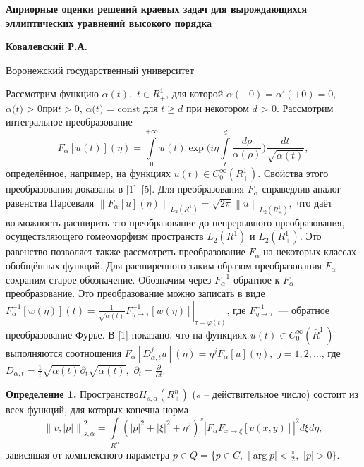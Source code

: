 
\begin{center}
\textbf{Априорные оценки решений краевых задач для вырождающихся
эллиптических уравнений высокого порядка}
\end{center}

\begin{center}
\textbf{Ковалевский Р.А.}
\end{center}

\begin{center}
Воронежский государственный университет
\end{center}


Рассмотрим функцию $\alpha (t),\,\,t \in R_ + ^1 $, для которой $\alpha ( +
0) = {\alpha }'( + 0) = 0$, $\alpha \mbox{(}t\mbox{) > 0}$при$t > 0$,
$\alpha \mbox{(}t\mbox{) = const}$ для $t \ge d$ при некотором $d\mbox{ >
0}$. Рассмотрим интегральное преобразование
\[
F_\alpha [u(t)](\eta ) = \int\limits_0^{ + \infty } {u(t)\exp (i\eta }
\int\limits_t^d {\frac{d\rho }{\alpha (\rho )}} )\frac{dt}{\sqrt {\alpha
(t)} },
\]
определённое, например,
на функциях $u(t) \in C_0^\infty (R_ + ^1
)$.
Свойства этого преобразования доказаны в
[1]--[5].
Для преобразования $F_\alpha $ справедлив аналог равенства Парсеваля
$\left\| {F_\alpha [u](\eta )} \right\|_{L_2 (R^1)} = \sqrt {2\pi } \left\|
u \right\|_{L_2 (R_ + ^1 )} ,$ что даёт возможность расширить это
преобразование до непрерывного преобразования, осуществляющего гомеоморфизм
пространств $L_{2} (R^1)$ и $L_{2} (R_ + ^1 )$. Это равенство
позволяет также рассмотреть преобразование $F_\alpha $ на некоторых классах
обобщённых функций. Для расширенного таким образом
\linebreak
преобразования $F_\alpha
$ сохраним старое обозначение. Обозначим через $F_\alpha ^{ - 1} $ обратное
к $F_\alpha $ преобразование. Это преобразование можно записать в виде
$F_\alpha ^{ - 1} [w(\eta )](t) = \left. {\frac{1}{\sqrt {\alpha (t)}
}F_{\eta \to \tau }^{ - 1} [w(\eta )]} \right|_{\tau = \varphi (t)} $, где
$F_{\eta \to \tau }^{ - 1} $~--- обратное преобразование Фурье. В [1]
показано, что на функциях $u(t) \in C_0^\infty (\bar {R}_ + ^1 )$
выполняются соотношения
\linebreak
$F_\alpha [D_{\alpha ,t}^j u](\eta ) = \eta
^jF_\alpha [u](\eta ),\,\,j = 1,2,...$, где $D_{\alpha ,t} =
\frac{1}{i}\sqrt {\alpha (t)} \partial _t \sqrt {\alpha (t)}
,$ $\partial _t = \frac{\partial }{\partial t}.$

\textbf{Определение 1.} Пространство$H_{s,\alpha } (R_ + ^n )$ ($s$ --
действительное число) состоит из всех функций, для которых конечна норма
\[
\left\| {v,\left| p \right|} \right\|_{s,\alpha }^2 = \int\limits_{R^n}
{(\left| p \right|^2 + \left| \xi \right|^2 + \eta ^2)^s\left| {F_\alpha
F_{x \to \xi } [v(x,y)]} \right|^2d\xi d\eta } ,
\]
зависящая от комплексного параметра $p \in Q = \{p \in C,\,\,\left| {\arg p}
\right| < \frac{\pi }{2},\,\,\left| p \right| > 0\}$.

